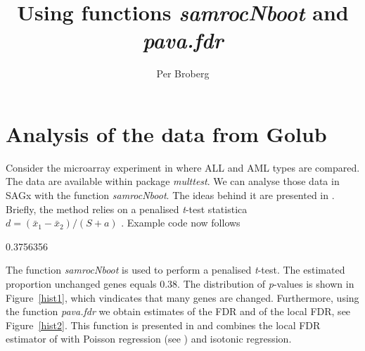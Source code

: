 \documentclass[a4paper]{article}
\begin{document}
\title{Using functions \textit{samrocNboot} and \textit{pava.fdr}}

\author{Per Broberg} 

\maketitle

\section*{Analysis of the data from Golub }

Consider the microarray experiment in \cite{golubetal} where ALL and AML types are compared.
The data are available within package \textit{multtest}. We can analyse those data in SAGx  with the function \textit{samrocNboot}. The ideas behind
it are presented in \cite{broberg:2003}. Briefly, the method relies on a penalised \textit{t}-test statistica $ d = (\bar{x}_1 - \bar{x}_2)/(S + a)$ \cite{efron:2001}. Example code now follows 

\begin{Schunk}
\begin{Soutput}
[1] 0.3756356
\end{Soutput}
\end{Schunk}
The function \textit{samrocNboot} is used to perform a penalised \textit{t}-test. The estimated
proportion unchanged genes equals 0.38. The distribution of \textit{p}-values is shown in Figure~\ref{hist1},
which vindicates that many genes are changed. Furthermore, using the function \textit{pava.fdr} we obtain estimates of the FDR and 
of the local FDR, see Figure~\ref{hist2}. This function is presented in \cite{broberg:2004} and combines the local FDR estimator 
of \cite{aubert:2004} with Poisson regression (see \cite{efron:2004}) and isotonic regression.
\end{document}
